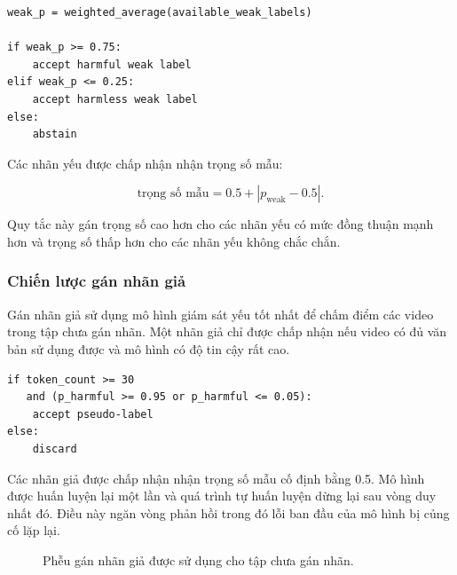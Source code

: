 \begin{verbatim}
weak_p = weighted_average(available_weak_labels)

if weak_p >= 0.75:
    accept harmful weak label
elif weak_p <= 0.25:
    accept harmless weak label
else:
    abstain
\end{verbatim}

Các nhãn yếu được chấp nhận nhận trọng số mẫu:

\begin{equation}
    \text{trọng số mẫu} = 0.5 + |p_{\text{weak}} - 0.5|.
\end{equation}

Quy tắc này gán trọng số cao hơn cho các nhãn yếu có mức đồng thuận mạnh hơn và trọng số thấp hơn cho các nhãn yếu không chắc chắn.

\subsubsection{Chiến lược gán nhãn giả}

Gán nhãn giả sử dụng mô hình giám sát yếu tốt nhất để chấm điểm các video trong tập chưa gán nhãn. Một nhãn giả chỉ được chấp nhận nếu video có đủ văn bản sử dụng được và mô hình có độ tin cậy rất cao.

\begin{verbatim}
if token_count >= 30
   and (p_harmful >= 0.95 or p_harmful <= 0.05):
    accept pseudo-label
else:
    discard
\end{verbatim}

Các nhãn giả được chấp nhận nhận trọng số mẫu cố định bằng 0.5. Mô hình được huấn luyện lại một lần và quá trình tự huấn luyện dừng lại sau vòng duy nhất đó. Điều này ngăn vòng phản hồi trong đó lỗi ban đầu của mô hình bị củng cố lặp lại.

\begin{figure}[H]
\centering
{}
\caption{Phễu gán nhãn giả được sử dụng cho tập chưa gán nhãn.}
\label{fig:implementation-pseudo-label-funnel}
\end{figure}

